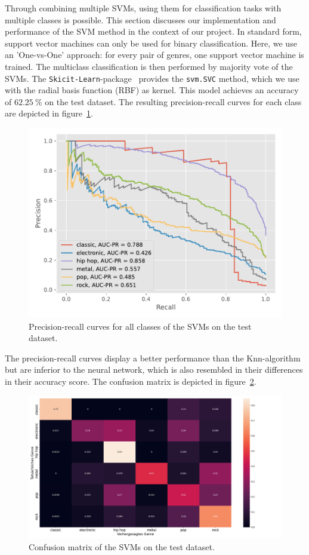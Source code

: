 \documentclass[
  12pt,
  bibliography=totoc,     %
  captions=tableheading,  %
  titlepage=firstiscover, %
]{scrartcl}
\begin{document}
Through combining multiple SVMs, using them for classification tasks with multiple
classes is possible.
This section discusses our implementation and performance of the SVM method in the context of our project.
In standard form, support vector machines can only be used for binary classification. Here, we use an 'One-vs-One' approach: for every pair of genres, one support vector
machine is trained. The multiclass classification is then performed by majority vote of the SVMs. The \texttt{Skicit-Learn}-package~\cite{scikit-learn} provides the \texttt{svm.SVC} method,
which we use with the radial basis function (RBF) as kernel. This model achieves an accuracy of $\SI{62.25}{\percent}$ on the test dataset. The resulting
precision-recall curves for each class are depicted in figure~\ref{fig:svm_pr}.
\begin{figure}[H]
  \centering
  \includegraphics[scale=0.7]{figures/svm/PR_SVM.pdf}
  \caption{Precision-recall curves for all classes of the SVMs on the test dataset.}
  \label{fig:svm_pr}
\end{figure}
\noindent
The precision-recall curves display a better performance than the Knn-algorithm but are inferior to the neural network, which is also resembled in their differences
in their accuracy score. The confusion matrix is depicted in figure~\ref{fig:conf_svm}.
\begin{figure}[H]
  \centering
  \includegraphics[scale=0.33]{figures/svm/confusion_matrix_svm.png}
  \caption{Confusion matrix of the SVMs on the test dataset.}
  \label{fig:conf_svm}
\end{figure}
\end{document}
